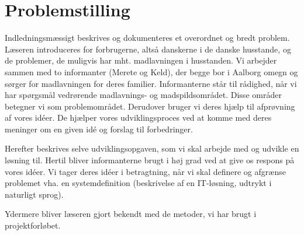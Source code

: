 \chapter{Problemstilling}
\label{chap:problemstilling}

Indledningsmæssigt beskrives og dokumenteres et overordnet og bredt problem. Læseren introduceres for forbrugerne, altså danskerne i de danske husstande, og de problemer, de muligvis har mht. madlavningen i husstanden. Vi arbejder sammen med to informanter (Merete og Keld), der begge bor i Aalborg omegn og sørger for madlavningen for deres familier. Informanterne står til rådighed, når vi har spørgsmål vedrørende \fx madlavnings- og madspildsområdet. Disse områder betegner vi som problemområdet. Derudover bruger vi deres hjælp til afprøvning af vores idéer. De hjælper vores udviklingsproces ved at komme med deres meninger om en given idé og forslag til forbedringer.

Herefter beskrives selve udviklingsopgaven, som vi skal arbejde med og udvikle en løsning til. Hertil bliver informanterne brugt i høj grad ved at give os respons på vores idéer. Vi tager deres idéer i betragtning, når vi skal definere og afgrænse problemet vha. en systemdefinition (beskrivelse af en IT-løsning, udtrykt i naturligt sprog).

Ydermere bliver læseren gjort bekendt med de metoder, vi har brugt i projektforløbet.

%



